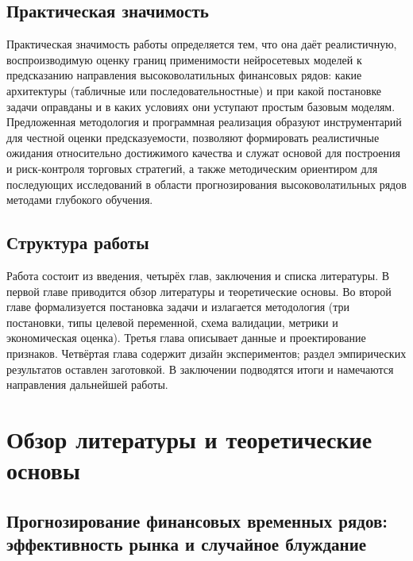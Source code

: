 \documentclass[12pt,a4paper]{report}
\begin{document}
\section*{Практическая значимость}

Практическая значимость работы определяется тем, что она даёт реалистичную,
воспроизводимую оценку границ применимости нейросетевых моделей к предсказанию
направления высоковолатильных финансовых рядов: какие архитектуры (табличные или
последовательностные) и при какой постановке задачи оправданы и в каких условиях
они уступают простым базовым моделям. Предложенная методология и программная
реализация образуют инструментарий для честной оценки предсказуемости, позволяют
формировать реалистичные ожидания относительно достижимого качества и служат
основой для построения и риск-контроля торговых стратегий, а также методическим
ориентиром для последующих исследований в области прогнозирования высоковолатильных
рядов методами глубокого обучения.

\section*{Структура работы}

Работа состоит из введения, четырёх глав, заключения и списка литературы. В
первой главе приводится обзор литературы и теоретические основы. Во второй главе
формализуется постановка задачи и излагается методология (три постановки, типы
целевой переменной, схема валидации, метрики и экономическая оценка). Третья глава
описывает данные и проектирование признаков. Четвёртая глава содержит дизайн
экспериментов; раздел эмпирических результатов оставлен заготовкой. В заключении
подводятся итоги и намечаются направления дальнейшей работы.

\chapter{Обзор литературы и теоретические основы}
\label{ch:review}

\section{Прогнозирование финансовых временных рядов: эффективность рынка и случайное блуждание}
\end{document}
